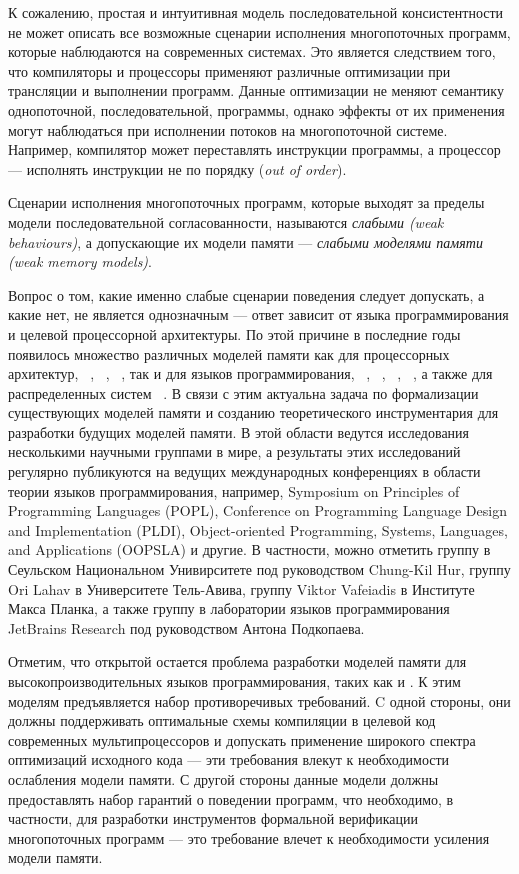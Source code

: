 К сожалению, простая и интуитивная модель последовательной консистентности 
не может описать все возможные сценарии исполнения многопоточных программ, 
которые наблюдаются на современных системах.
Это является следствием того, что компиляторы и процессоры применяют 
различные оптимизации при трансляции и выполнении программ.
Данные оптимизации не меняют семантику однопоточной, последовательной, программы, 
однако эффекты от их применения могут наблюдаться при исполнении потоков на многопоточной системе.
Например, компилятор может переставлять инструкции программы, 
а процессор --- исполнять инструкции не по порядку (\emph{out of order}).

Сценарии исполнения многопоточных программ, 
которые выходят за пределы модели последовательной согласованности,
называются \emph{слабыми (weak behaviours)}, а допускающие их модели памяти ---
\emph{слабыми моделями памяти (weak memory models)}.

Вопрос о том, какие именно слабые сценарии поведения 
следует допускать, а какие нет, не является однозначным --- ответ  
зависит от языка программирования и целевой процессорной архитектуры.
По этой причине в последние годы появилось множество
различных моделей памяти как для процессорных архитектур, \Intel~\autocite{Sewell-al:CACM10}, 
\ARM~\autocite{Pulte-al:POPL18}, 
\POWER~\autocite{Sarkar-al:PLDI11}, так и для языков программирования,
\CPP~\autocite{Batty-al:POPL11},
\Java~\autocite{Manson-al:POPL05}, 
\JS~\autocite{Watt-al:PLDI2020}, 
\OCaml~\autocite{Dolan-al:PLDI18},
а также для распределенных систем%
~\autocite{Jagadeesan-al:ESOP2018,Lahav-Boker:PLDI2020}.
В связи с этим актуальна задача по формализации 
существующих моделей памяти и созданию теоретического инструментария
для разработки будущих моделей памяти.
В этой области ведутся исследования несколькими научными группами в мире,
а результаты этих исследований регулярно публикуются на ведущих
международных конференциях в области теории языков программирования,
например, Symposium on Principles of Programming Languages (POPL),
Conference on Programming Language Design and Implementation (PLDI),
Object-oriented Programming, Systems, Languages, and Applications (OOPSLA) и другие. 
В частности, можно отметить группу в Сеульском Национальном Унивирситете
под руководством Chung-Kil Hur, группу Ori Lahav в Университете Тель-Авива,
группу Viktor Vafeiadis в Институте Макса Планка,
а также группу в лаборатории языков программирования JetBrains Research
под руководством Антона Подкопаева.

Отметим, что открытой остается проблема разработки моделей памяти
для высокопроизводительных языков программирования, таких как \CPP и \Java.
К этим моделям предъявляется набор противоречивых требований.
C одной стороны, они должны поддерживать оптимальные схемы компиляции в
целевой код современных мультипроцессоров и допускать применение
широкого спектра оптимизаций исходного кода --- эти требования
влекут к необходимости ослабления модели памяти.
С другой стороны данные модели должны предоставлять набор
гарантий о поведении программ, что необходимо, в частности, для разработки инструментов
формальной верификации многопоточных программ --- это требование
влечет к необходимости усиления модели памяти.

